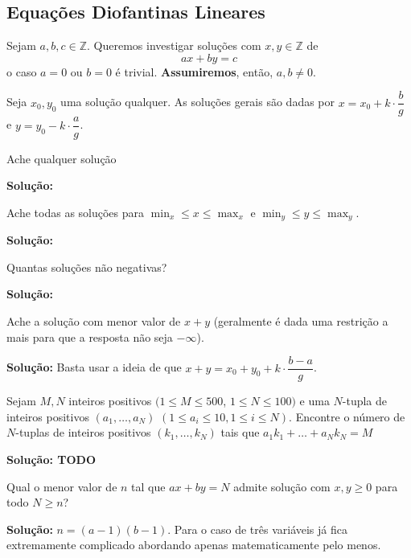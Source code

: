 \subsection{Equações Diofantinas Lineares}

Sejam $a, b, c \in \mathbb{Z}$. Queremos investigar soluções com $x, y \in \mathbb{Z}$ de 
$$ax + by = c$$
o caso $a=0$ ou $b=0$ é trivial. \textbf{Assumiremos}, então, $a, b \neq 0$.

Seja $x_0, y_0$ uma solução qualquer. As soluções gerais são dadas por $x = x_0 + k \cdot \dfrac{b}{g}$ e $y = y_0 - k \cdot \dfrac{a}{g}$.

 Ache qualquer solução

\textbf{Solução:}

 Ache todas as soluções para $\min_x \leq x \leq \max_x$ e $\min_y \leq y \leq \max_y$.

\textbf{Solução:}

 Quantas soluções não negativas?

\textbf{Solução:}

 Ache a solução com menor valor de $x+y$ (geralmente é dada uma restrição a mais para que a resposta não seja $- \infty$).

\textbf{Solução:} Basta usar a ideia de que $x+y = x_0 + y_0 + k \cdot \dfrac{b - a}{g}$. 

 Sejam $M, N$ inteiros positivos $(1 \leq M \leq 500$, $1 \leq N \leq 100)$ e uma $N$-tupla de inteiros positivos $(a_1, \dots, a_N)$ $(1 \leq a_i \leq 10, 1 \leq i \leq N)$. Encontre o número de $N$-tuplas de inteiros positivos $(k_1, \dots, k_N)$ tais que $a_1 k_1 + \dots + a_N k_N = M$

\textbf{Solução: TODO} 

 Qual o menor valor de $n$ tal que $ax + by = N$ admite solução com $x, y \geq 0$ para todo $N \geq n$?

\textbf{Solução:} $n = (a-1)(b-1)$. Para o caso de três variáveis já fica extremamente complicado abordando apenas matematicamente pelo menos.